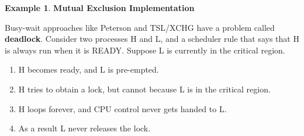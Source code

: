 \documentclass[12pt,a4paper]{article}
\theoremstyle{definition}
\newtheorem{example}{Example}[section]
\newenvironment{myitemize}
{ \begin{itemize}
    \setlength{\itemsep}{5pt}
    \setlength{\parskip}{0pt}
    \setlength{\parsep}{0pt}     }
{ \end{itemize}                  }
\newenvironment{myenumerate}
{ \begin{enumerate}
    \setlength{\itemsep}{5pt}
    \setlength{\parskip}{0pt}
    \setlength{\parsep}{0pt}     }
{ \end{enumerate}                }
\begin{document}
\begin{example}{\textbf{Mutual Exclusion Implementation}}
\begin{myitemize}
\begin{myitemize}
		\end{myitemize}
		\begin{tcolorbox}
			\textsf{Busy-wait approaches like Peterson and TSL/XCHG have a problem called \textbf{deadlock}.} Consider two processes H and L, and a scheduler rule that says that H is always run when it is READY. Suppose L is currently in the critical region.
			\begin{myenumerate}
				\item H becomes ready, and L is pre-empted.
				\item H tries to obtain a lock, but cannot because L is in the critical region.
				\item H loops forever, and CPU control never gets handed to L.
				\item As a result L never releases the lock.
			\end{myenumerate}
			

\end{tcolorbox}
\end{myitemize}
\end{example}
\end{document}
